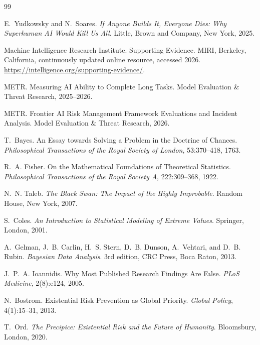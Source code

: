 \documentclass[11pt]{article}
\begin{document}
\begin{thebibliography}{99}

E.~Yudkowsky and N.~Soares.
\newblock \emph{If Anyone Builds It, Everyone Dies: Why Superhuman AI Would Kill Us All}.
\newblock Little, Brown and Company, New York, 2025.

Machine Intelligence Research Institute.
\newblock Supporting Evidence.
\newblock MIRI, Berkeley, California, continuously updated online resource,
accessed 2026.
\newblock \url{https://intelligence.org/supporting-evidence/}.

METR.
\newblock Measuring AI Ability to Complete Long Tasks.
\newblock Model Evaluation \& Threat Research, 2025--2026.

METR.
\newblock Frontier AI Risk Management Framework Evaluations and Incident Analysis.
\newblock Model Evaluation \& Threat Research, 2026.

T.~Bayes.
\newblock An Essay towards Solving a Problem in the Doctrine of Chances.
\newblock \emph{Philosophical Transactions of the Royal Society of London},
53:370--418, 1763.

R.~A. Fisher.
\newblock On the Mathematical Foundations of Theoretical Statistics.
\newblock \emph{Philosophical Transactions of the Royal Society A},
222:309--368, 1922.

N.~N. Taleb.
\newblock \emph{The Black Swan: The Impact of the Highly Improbable}.
\newblock Random House, New York, 2007.

S.~Coles.
\newblock \emph{An Introduction to Statistical Modeling of Extreme Values}.
\newblock Springer, London, 2001.

A.~Gelman, J.~B. Carlin, H.~S. Stern, D.~B. Dunson,
A.~Vehtari, and D.~B. Rubin.
\newblock \emph{Bayesian Data Analysis}.
\newblock 3rd edition, CRC Press, Boca Raton, 2013.

J.~P.~A. Ioannidis.
\newblock Why Most Published Research Findings Are False.
\newblock \emph{PLoS Medicine}, 2(8):e124, 2005.

N.~Bostrom.
\newblock Existential Risk Prevention as Global Priority.
\newblock \emph{Global Policy}, 4(1):15--31, 2013.

T.~Ord.
\newblock \emph{The Precipice: Existential Risk and the Future of Humanity}.
\newblock Bloomsbury, London, 2020.

\end{thebibliography}
\end{document}

